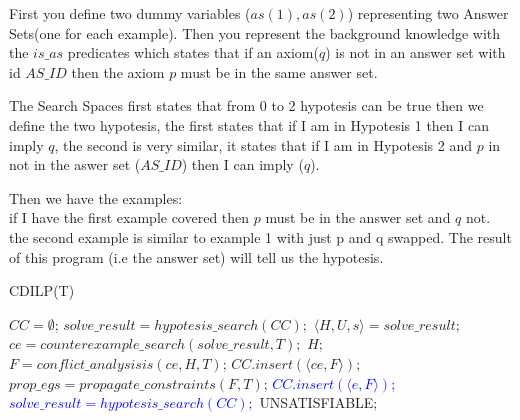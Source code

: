 First you define two dummy variables ($as(1), as(2)$) representing two Answer Sets(one for each example).
Then you represent the background knowledge with the $is\_as$ predicates which states that
if an axiom($q$) is not in an answer set with id $AS\_ID$ then the axiom $p$ must be in 
the same answer set.

The Search Spaces first states that from 0 to 2 hypotesis can be true then we define the two hypotesis,
the first states that if I am in Hypotesis 1 then I can imply $q$, the second is very similar, it states that
if I am in Hypotesis 2 and $p$ in not in the aswer set ($AS\_ID$) then I can imply ($q$).

Then we have the examples:\\
if I have the first example covered then $p$ must be in the answer set and $q$ not.\\
the second example is similar to example 1 with just p and q swapped.
The result of this program (i.e the answer set) will tell us the hypotesis.

\begin{algorithm}[H]
    \caption{CDILP(T)}
    \begin{algorithmic}[1]  
        \State $CC=\emptyset$;
        \State $solve\_result = hypotesis\_search(CC);$
        \State $\langle H,U,s\rangle=solve\_result;$
        \State $ce=counterexample\_search(solve\_result, T);$
        \State \Return $H$;
        \Else
        \State $F=conflict\_analysisis(ce,H,T)$;
        \State $CC.insert(\langle ce, F\rangle)$;
        \State $prop\_egs=propagate\_constraints(F,T)$;
        \textcolor{Blue}{
            \State $CC.insert(\langle e, F\rangle)$;
            \EndFor
            \State $solve\_result = hypotesis\_search(CC);$
        }
        \EndIf
        \EndWhile
        \State\Return UNSATISFIABLE;
        \EndProcedure
    \end{algorithmic}
\end{algorithm}

